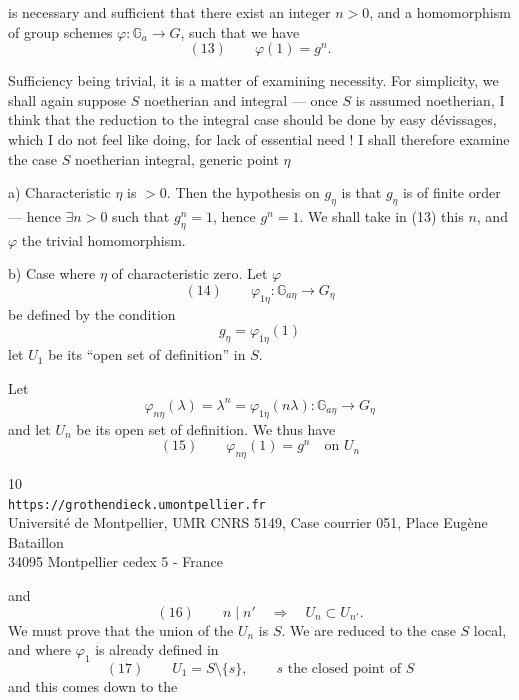 is necessary and sufficient that there exist an integer $n>0$, and a homomorphism of group schemes $\varphi:\mathbb G_a\longrightarrow G$, such that we have
\[
(13)\qquad \varphi(1)=g^n.
\]

Sufficiency being trivial, it is a matter of examining necessity. For simplicity, we shall again suppose $S$ noetherian and integral --- once $S$ is assumed noetherian, I think that the reduction to the integral case should be done by easy dévissages, which I do not feel like doing, for lack of essential need ! I shall therefore examine the case $S$ noetherian integral, generic point $\eta$

a) Characteristic  $\eta$ is $>0$. Then  the hypothesis on $g_\eta$ is that $g_\eta$ is of finite order --- hence $\exists n>0$ such that $g_\eta^n=1$, hence $g^n=1$. We shall take in (13) this $n$, and $\varphi$ the trivial homomorphism.

b) Case where $\eta$ of characteristic zero. Let $\varphi$
\[
(14)\qquad \varphi_{1\eta}:\mathbb G_{a\eta}\longrightarrow G_\eta
\]
be defined by the condition
\[
g_\eta=\varphi_{1\eta}(1)
\]
let $U_1$ be its ``open set of definition'' in $S$.

Let
\[
\varphi_{n\eta}(\lambda)=\lambda^n=\varphi_{1\eta}(n\lambda):\mathbb G_{a\eta}\longrightarrow G_\eta
\]
and let $U_n$ be its open set of definition. We thus have
\[
(15)\qquad\varphi_{n\eta}(1)=g^n\quad\text{on }U_n
\]

\begin{center}
\small
10\\
\texttt{https://grothendieck.umontpellier.fr}\\
Université de Montpellier, UMR CNRS 5149, Case courrier 051, Place Eugène Bataillon\\
34095 Montpellier cedex 5 - France
\end{center}

and
\[
(16)\qquad n\mid n'\quad\Longrightarrow\quad U_n\subset U_{n'}.
\]
We must prove that the union of the $U_n$ is $S$. We are reduced to the case $S$ local, and where $\varphi_1$ is already defined in
\[
(17)\qquad U_1=S\setminus\{s\},\qquad s\text{ the closed point of }S
\]
and this comes down to the

